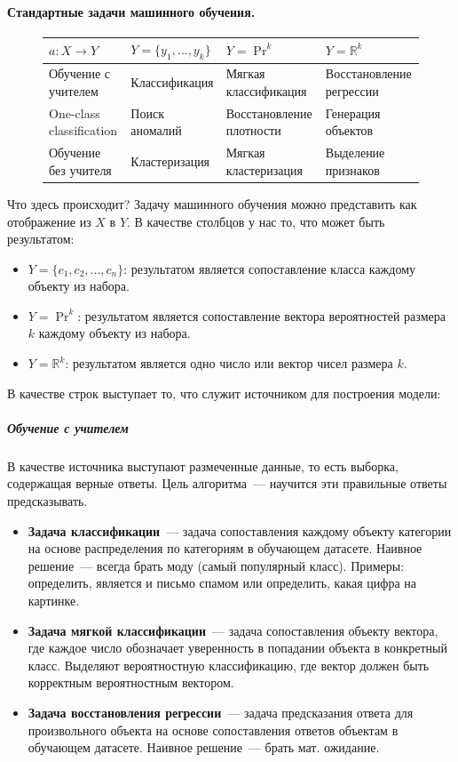 \documentclass{article}
\begin{document}
    \paragraph{Стандартные задачи машинного обучения.}
    \begin{figure}[H]
        \begin{tabularx}{0.8\textwidth}{|X|XXX|}
            \hline
            $a\colon X\to Y$ & $Y=\{y_1,\ldots,y_k\}$ & $Y=\operatorname{Pr}^k$ & $Y=\mathbb R^k$\\
            \hline
            Обучение с учителем & Классификация & Мягкая классификация & Восстановление регрессии\\
            \hline
            One-class classification & Поиск аномалий & Восстановление плотности & {\color{red}Генерация объектов}\\
            \hline
            Обучение без учителя & Кластеризация & Мягкая кластеризация & Выделение признаков\\
            \hline
        \end{tabularx}
    \end{figure}\noindent
    Что здесь происходит? Задачу машинного обучения можно представить как отображение из $X$ в $Y$.
    В качестве столбцов у нас то, что может быть результатом:
    \begin{itemize}
        \item $Y=\{c_1,c_2,...,c_n\}$: результатом является сопоставление класса каждому объекту из набора. 
        \item $Y=\operatorname{Pr}^k$: результатом является сопоставление вектора вероятностей размера $k$ каждому объекту из набора.
        \item $Y=\mathbb{R}^k$: результатом является одно число или вектор чисел размера $k$.
    \end{itemize}
    В качестве строк выступает то, что служит источником для построения модели:
    \subparagraph{Обучение с учителем}
    В качестве источника выступают размеченные данные, то есть выборка, содержащая верные ответы. Цель алгоритма~--- научится эти правильные ответы предсказывать.
    \begin{itemize}
        \item \textbf{Задача классификации}~--- задача сопоставления каждому объекту категории на основе распределения по категориям в обучающем датасете. Наивное решение~--- всегда брать моду (самый популярный класс). Примеры: определить, является и письмо спамом или определить, какая цифра на картинке.
        \item \textbf{Задача мягкой классификации}~--- задача сопоставления объекту вектора, где каждое число обозначает уверенность в попадании объекта в конкретный класс. Выделяют вероятностную классификацию, где вектор должен быть корректным вероятностным вектором.
        \item \textbf{Задача восстановления регрессии}~--- задача предсказания ответа для произвольного объекта на основе сопоставления ответов объектам в обучающем датасете. Наивное решение~--- брать мат. ожидание.
    \end{itemize}
\end{document}
